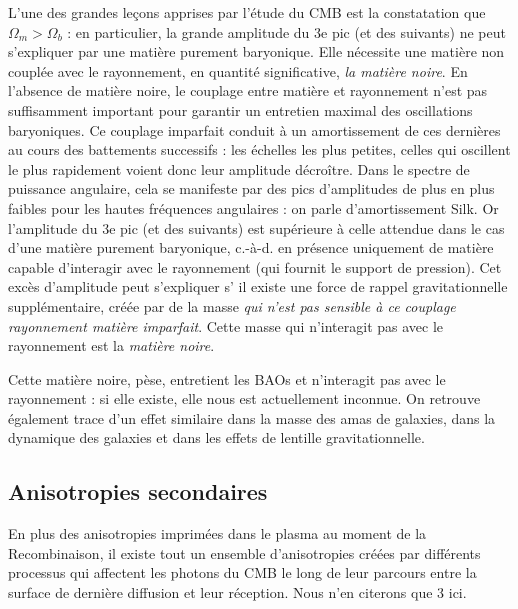 L'une des grandes leçons apprises par l'étude du CMB est la constatation que $\Omega_m>\Omega_b$ : en particulier, la grande amplitude du 3e pic (et des suivants) ne peut s'expliquer par une matière purement baryonique. Elle nécessite une matière non couplée avec le rayonnement, en quantité significative, \textit{la matière noire}. En l'absence de matière noire, le couplage entre matière et rayonnement n'est pas suffisamment important pour garantir un entretien maximal des oscillations baryoniques. Ce couplage imparfait conduit à un amortissement de ces dernières au cours des battements successifs : les échelles les plus petites, celles qui oscillent le plus rapidement voient donc leur amplitude décroître. Dans le spectre de puissance angulaire, cela se manifeste par des pics d'amplitudes de plus en plus faibles pour les hautes fréquences angulaires : on parle d'amortissement Silk. Or l'amplitude du 3e pic (et des suivants) est supérieure à celle attendue dans le cas d'une matière  purement baryonique, c.-à-d. en présence uniquement de matière capable d'interagir avec le rayonnement (qui fournit le support de pression). Cet excès d'amplitude peut s'expliquer s’ il existe une force de rappel gravitationnelle supplémentaire, créée par de la masse \textit{qui n'est pas sensible à ce couplage rayonnement matière imparfait}. Cette masse qui n'interagit pas avec le rayonnement est la \textit{matière noire}.

Cette matière noire, pèse, entretient les BAOs et n'interagit pas avec le rayonnement : si elle existe, elle nous est actuellement inconnue. On retrouve également trace d'un effet similaire dans la masse des amas de galaxies, dans la dynamique des galaxies et dans les effets de lentille gravitationnelle.

\subsection{Anisotropies secondaires}
En plus des anisotropies imprimées dans le plasma au moment de la Recombinaison, il existe tout un ensemble d'anisotropies créées par différents processus qui affectent les photons du CMB le long de leur parcours entre la surface de dernière diffusion et leur réception. Nous n'en citerons que 3 ici.

